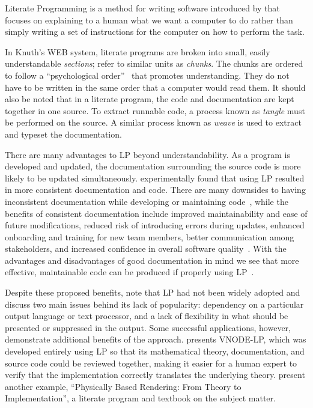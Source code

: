 Literate Programming is a method for writing software introduced by
\citet{Knuth1984} that focuses on explaining to a human what we want a computer
to do rather than simply writing a set of instructions for the computer on how
to perform the task.

In Knuth's WEB system, literate programs are broken into small, easily
understandable \emph{sections}; \citet{JohnsonAndJohnson1997} refer to similar
units as \emph{chunks}. The chunks are ordered to follow a
``psychological order''~\citep{PieterseKourieAndBoake2004} that promotes
understanding. They do not have to be written in the 
same order that a computer would read them. It should also be noted that in a 
literate program, the code and documentation are kept together in one source. 
To extract runnable code, a process known as \emph{tangle} must be performed on 
the source. A similar process known as \emph{weave} is used to extract and 
typeset the documentation.

There are many advantages to LP beyond understandability. As a program is
developed and updated, the documentation surrounding the source code is more 
likely to be updated simultaneously. \citet{ShumAndCook1993} experimentally
found that using LP resulted in more consistent documentation and code. There
are many downsides to having inconsistent
documentation while developing or maintaining 
code~\citep{Kotula2000,Thimbleby1986}, while the benefits of consistent
documentation include improved maintainability and ease of
future modifications, reduced risk of introducing errors during updates,
enhanced onboarding and training for new team members, better communication
among stakeholders, and increased confidence in overall software
quality~\citep{Hyman1990,Kotula2000,Parnas2010,ParnasAndClements1986,
ParnasEtAl1994}. With the advantages and disadvantages of good documentation
in mind we see that more effective, maintainable code can be produced if 
properly using LP~\citep{PieterseKourieAndBoake2004}.

Despite these proposed benefits, \citet{ShumAndCook1993} note that LP had not
been widely adopted and discuss two main issues behind its lack of popularity:
dependency on a particular output language or text processor, and a lack of
flexibility in what should be presented or suppressed in the output. Some
successful applications, however, demonstrate additional benefits of the
approach. \citet{Nedialkov2006} presents VNODE-LP, which was developed entirely
using LP so that its mathematical theory, documentation, and source code could
be reviewed together, making it easier for a human expert to verify that the
implementation correctly translates the underlying theory.
\citet{PharrAndHumphreys2004} present another example, ``Physically Based
Rendering: From Theory to Implementation'', a literate program and textbook on
the subject matter.

